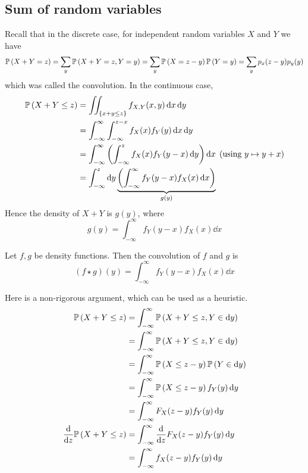 \subsection{Sum of random variables}
Recall that in the discrete case, for independent random variables \(X\) and \(Y\) we have
\[
	\mathbb{P}\left({X+Y = z}\right) = \sum_y \mathbb{P}\left({X+Y = z, Y=y}\right) = \sum_y \mathbb{P}\left({X = z-y}\right) \mathbb{P}\left({Y = y}\right) = \sum_y p_x(z-y) p_y(y)
\]
which was called the convolution.
In the continuous case,
\begin{align*}
	\mathbb{P}\left({X+Y \leq z}\right) & = \iint_{\{ x+y \leq z \}} f_{X, Y}(x, y) \dd{x}\dd{y}                                                                   \\
	                  & = \int_{-\infty}^\infty \int_{-\infty}^{z-x} f_X(x)f_Y(y) \dd{x}\dd{y}                                                   \\
	                  & = \int_{-\infty}^\infty \left( \int_{-\infty}^{z} f_X(x)f_Y(y-x) \dd{y} \right) \dd{x}\; (\text{using } y \mapsto y + x) \\
	                  & = \int_{-\infty}^z \dd{y} \underbrace{\left( \int_{-\infty}^\infty f_Y(y-x) f_X(x) \dd{x} \right)}_{g(y)}
\end{align*}
Hence the density of \(X+Y\) is \(g(y)\), where
\[
	g(y) = \int_{-\infty}^\infty f_Y(y-x) f_X(x) \dd{x}
\]
\begin{definition}
	Let \(f, g\) be density functions.
	Then the convolution of \(f\) and \(g\) is
	\[
		(f \star g)(y) = \int_{-\infty}^\infty f_Y(y-x) f_X(x) \dd{x}
	\]
\end{definition}
\noindent Here is a non-rigorous argument, which can be used as a heuristic.
\begin{align*}
	\mathbb{P}\left({X + Y \leq z}\right)        & = \int_{-\infty}^\infty \mathbb{P}\left({X + Y \leq z, Y \in \dd{y}}\right)      \\
	                           & = \int_{-\infty}^\infty \mathbb{P}\left({X + Y \leq z, Y \in \dd{y}}\right)      \\
	                           & = \int_{-\infty}^\infty \mathbb{P}\left({X \leq z - y}\right)\mathbb{P}\left({Y \in \dd{y}}\right) \\
	                           & = \int_{-\infty}^\infty \mathbb{P}\left({X \leq z - y}\right)f_Y(y)\dd{y}        \\
	                           & = \int_{-\infty}^\infty F_X(z - y)f_Y(y)\dd{y}                 \\
	\dv{z} \mathbb{P}\left({X + Y \leq z}\right) & = \int_{-\infty}^\infty \dv{z} F_X(z - y)f_Y(y)\dd{y}          \\
	                           & = \int_{-\infty}^\infty f_X(z - y)f_Y(y)\dd{y}                 \\
\end{align*}

